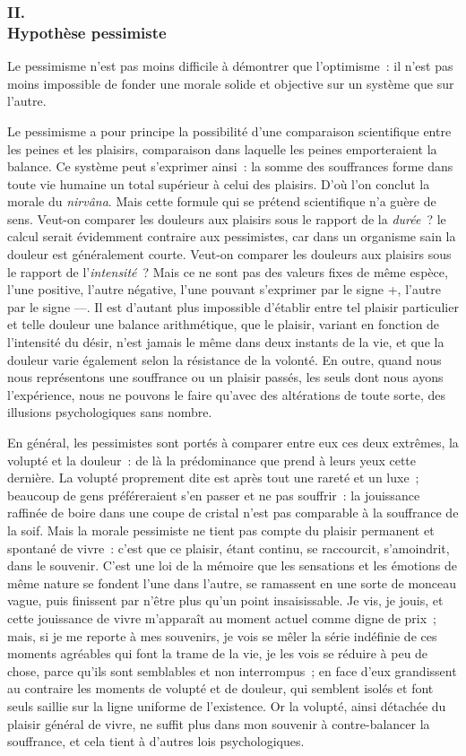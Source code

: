 \documentclass[french,twoside]{book} %
\begin{document}
\subsubsection[{II. Hypothèse pessimiste}]{II. \\
Hypothèse pessimiste}
\noindent Le pessimisme n’est pas moins difficile à démontrer que l’optimisme : il n’est pas moins impossible de fonder une morale solide et objective sur un système que sur l’autre.\par
Le pessimisme a pour principe la possibilité d’une comparaison scientifique entre les peines et les plaisirs, comparaison dans laquelle les peines emporteraient la balance. Ce système peut s’exprimer ainsi : la somme des souffrances forme dans toute vie humaine un total supérieur à celui des plaisirs. D’où l’on conclut la morale du \emph{nirvâna}. Mais cette formule qui se prétend scientifique n’a guère de sens. Veut-on comparer les douleurs aux plaisirs sous le rapport de la \emph{durée} ? le calcul serait évidemment contraire aux pessimistes, car dans un organisme sain la douleur est généralement courte. Veut-on comparer les douleurs aux plaisirs sous le rapport de l’\emph{intensité} ? Mais ce ne sont pas des valeurs fixes de même espèce, l’une positive, l’autre négative, l’une pouvant s’exprimer par le signe +, l’autre par le signe —. Il est d’autant plus impossible d’établir entre tel plaisir particulier et telle douleur une balance arithmétique, que le plaisir, variant en fonction de l’intensité du désir, n’est jamais le même dans deux instants de la vie, et que la douleur varie également selon la résistance de la volonté. En outre, quand nous nous représentons une souffrance ou un plaisir passés, les seuls dont nous ayons l’expérience, nous ne pouvons le faire qu’avec des altérations de toute sorte, des illusions psychologiques sans nombre.\par
En général, les pessimistes sont portés à comparer entre eux ces deux extrêmes, la volupté et la douleur : de là la prédominance que prend à leurs yeux cette dernière. La volupté proprement dite est après tout une rareté et un luxe ; beaucoup de gens préféreraient s’en passer et ne pas souffrir : la jouissance raffinée de boire dans une coupe de cristal n’est pas comparable à la souffrance de la soif. Mais la morale pessimiste ne tient pas compte du plaisir permanent et spontané de vivre : c’est que ce plaisir, étant continu, se raccourcit, s’amoindrit, dans le souvenir. C’est une loi de la mémoire que les sensations et les émotions de même nature se fondent l’une dans l’autre, se ramassent en une sorte de monceau vague, puis finissent par n’être plus qu’un point insaisissable. Je vis, je jouis, et cette jouissance de vivre m’apparaît au moment actuel comme digne de prix ; mais, si je me reporte à mes souvenirs, je vois se mêler la série indéfinie de ces moments agréables qui font la trame de la vie, je les vois se réduire à peu de chose, parce qu’ils sont semblables et non interrompus ; en face d’eux grandissent au contraire les moments de volupté et de douleur, qui semblent isolés et font seuls saillie sur la ligne uniforme de l’existence. Or la volupté, ainsi détachée du plaisir général de vivre, ne suffit plus dans mon souvenir à contre-balancer la souffrance, et cela tient à d’autres lois psychologiques.\par
\end{document}
